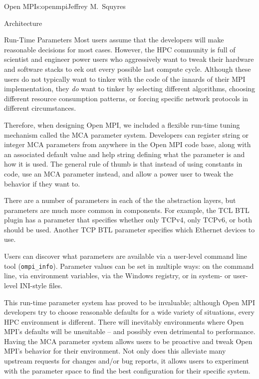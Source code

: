 \begin{aosachapter}{Open MPI}{s:openmpi}{Jeffrey M.\ Squyres}
\begin{aosasect1}{Architecture}
\begin{aosasect2}{Run-Time Parameters}
Most users assume that the developers will make reasonable decisions
for most cases.  
%
However, the HPC community is full of scientist and engineer power
users who aggressively want to tweak their hardware and software
stacks to eek out every possible last compute cycle.
%
Although these users do not typically want to tinker with the code of
the innards of their MPI implementation, they {\em do} want to tinker
by selecting different algorithms, choosing different resource
consumption patterns, or forcing specific network protocols in
different circumstances.

Therefore, when designing Open MPI, we included a flexible run-time
tuning mechanism called the MCA parameter system.
%
Developers can register string or integer MCA parameters from anywhere
in the Open MPI code base, along with an associated default value and
help string defining what the parameter is and how it is used.
%
The general rule of thumb is that instead of using constants in code,
use an MCA parameter instead, and allow a power user to tweak the
behavior if they want to.

There are a number of parameters in each of the the abstraction
layers, but parameters are much more common in components.
%
For example, the TCL BTL plugin has a parameter that specifies whether
only TCPv4, only TCPv6, or both should be used.
%
Another TCP BTL parameter specifies which Ethernet devices to use.

Users can discover what parameters are available via a user-level
command line tool ({\tt ompi\_\-info}).
%
Parameter values can be set in multiple ways: on the command line, via
environment variables, via the Windows registry, or in system- or
user-level INI-style files.

This run-time parameter system has proved to be invaluable; although
Open MPI developers try to choose reasonable defaults for a wide
variety of situations, every HPC environment is different.  There will
inevitably environments where Open MPI's defaults will be unsuitable
-- and possibly even detrimental to performance.  
%
Having the MCA parameter system allows users to be proactive and tweak
Open MPI's behavior for their environment.  Not only does this
alleviate many upstream requests for changes and/or bug reports, it
allows users to experiment with the parameter space to find the best
configuration for their specific system.

\end{aosasect2}

\end{aosasect1}


\end{aosachapter}
